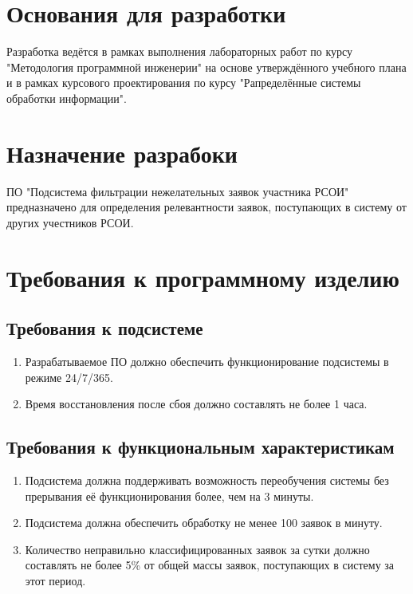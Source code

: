 \documentclass[utf8x, 12pt]{G7-32}
\begin{document}
\nobreakingbeforechapters
\chapter{Основания для разработки}

Разработка ведётся в рамках выполнения лабораторных работ по курсу "Методология
программной инженерии" на основе утверждённого учебного плана и в рамках курсового
проектирования по курсу "Рапределённые системы обработки информации".

\chapter{Назначение разрабоки}

ПО "Подсистема фильтрации нежелательных заявок участника РСОИ"  предназначено
для определения релевантности заявок, поступающих в систему от других учестников
РСОИ.

\chapter{Требования к программному изделию}

\section{Требования к подсистеме}

\begin{enumerate}
        \item Разрабатываемое ПО должно обеспечить функционирование подсистемы
        в режиме 24/7/365.
        \item Время восстановления после сбоя должно составлять не более 1 часа.
\end{enumerate}

\section{Требования к функциональным характеристикам}

\begin{enumerate}
        \item Подсистема должна поддерживать возможность переобучения системы без
        прерывания её функционирования более, чем на 3 минуты.
        \item Подсистема должна обеспечить обработку не  менее 100 заявок в минуту.
        \item Количество неправильно классифицированных заявок за сутки должно 
        составлять не более 5\% от общей массы заявок, поступающих в систему за этот 
        период.
\end{enumerate}
\end{document}
